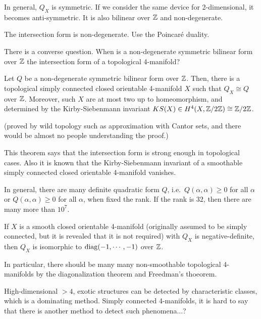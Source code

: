 \documentclass{../../../small}
\begin{document}
In general, $Q_X$ is symmetric.
If we consider the same device for 2-dimensional, it becomes anti-symmetric.
It is also bilinear over $\mathbb{Z}$ and non-degenerate.

\begin{exe}
The intersection form is non-degenerate.
Use the Poincar\'e duality.
\end{exe}

There is a converse question.
When is a non-degenerate symmetric bilinear form over $\mathbb{Z}$ the intersection form of a topological 4-manifold?

\begin{thm}[Freedman, 1982]
Let $Q$ be a non-degenerate symmetric bilinear form over $\mathbb{Z}$.
Then, there is a topological simply connected closed orientable 4-manifold $X$ such that $Q_X\cong Q$ over $\mathbb{Z}$.
Moreover, such $X$ are at most two up to homeomorphism, and determined by the Kirby-Siebenmann invariant $KS(X)\in H^4(X,\mathbb{Z}/2\mathbb{Z})\cong\mathbb{Z}/2\mathbb{Z}$.
\end{thm}

(proved by wild topology such as approximation with Cantor sets, and there would be almost no people understanding the proof.)

This theorem says that the intersection form is strong enough in topological cases.
Also it is known that the Kirby-Siebenmann invariant of a smoothable simply connected closed orientable 4-manifold vanishes.

In general, there are many definite quadratic form $Q$, i.e.~$Q(\alpha,\alpha)\ge0$ for all $\alpha$ or $Q(\alpha,\alpha)\ge0$ for all $\alpha$, when fixed the rank.
If the rank is $32$, then there are many more than $10^7$.


\begin{thm}
If $X$ is a smooth closed orientable 4-manifold (originally assumed to be simply connected, but it is revealed that it is not required) with $Q_X$ is negative-definite, then $Q_X$ is isomorphic to $\operatorname{diag}(-1,\cdots,-1)$ over $\mathbb{Z}$.
\end{thm}

In particular, there should be many many non-smoothable topological 4-manifolds by the diagonalization theorem and Freedman's thoeorem.


High-dimensional $>4$, exotic structures can be detected by characteristic classes, which is a dominating method.
Simply connected 4-manifolds, it is hard to say that there is another method to detect such phenomena...?
\end{document}
